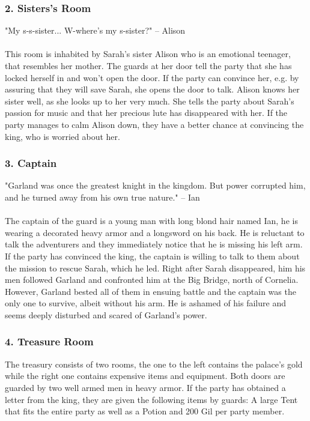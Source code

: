 \subsubsection*{2. Sisters's Room}
"My s-s-sister... W-where's my s-sister?"
\indent -- Alison\\\\
This room is inhabited by Sarah's sister Alison who is an emotional teenager, that resembles her mother.
The guards at her door tell the party that she has locked herself in and won't open the door.
If the party can convince her, e.g. by assuring that they will save Sarah, she opens the door to talk.
Alison knows her sister well, as she looks up to her very much.
She tells the party about Sarah's passion for music and that her precious lute has disappeared with her.
If the party manages to calm Alison down, they have a better chance at convincing the king, who is worried about her. 

\subsubsection*{3. Captain}
"Garland was once the greatest knight in the kingdom. But power corrupted him, and he turned away from his own true nature."
\indent -- Ian \\\\
The captain of the guard is a young man with long blond hair named Ian, he is wearing a decorated heavy armor and a longsword on his back.
He is reluctant to talk the adventurers and they immediately notice that he is missing his left arm. 
If the party has convinced the king, the captain is willing to talk to them about the mission to rescue Sarah, which he led.
Right after Sarah disappeared, him his men followed Garland and confronted him at the Big Bridge, north of Cornelia.
However, Garland bested all of them in ensuing battle and the captain was the only one to survive, albeit without his arm.
He is ashamed of his failure and seems deeply disturbed and scared of Garland's power.

\subsubsection*{4. Treasure Room}
The treasury consists of two rooms, the one to the left contains the palace's gold while the right one contains expensive items and equipment.
Both doors are guarded by two well armed men in heavy armor.
If the party has obtained a letter from the king, they are given the following items by guards: 
A large Tent that fits the entire party as well as a Potion and 200 Gil per party member.

